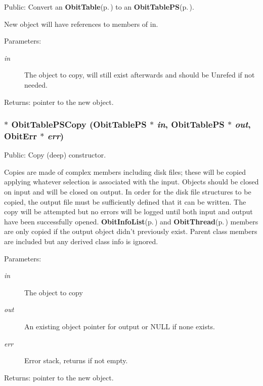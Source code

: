 Public: Convert an {\bf Obit\-Table}{\rm (p.\,\pageref{structObitTable})} to an {\bf Obit\-Table\-PS}{\rm (p.\,\pageref{structObitTablePS})}. 

New object will have references to members of in. \begin{Desc}
\item[Parameters:]
\begin{description}
\item[{\em in}]The object to copy, will still exist afterwards and should be Unrefed if not needed. \end{description}
\end{Desc}
\begin{Desc}
\item[Returns:]pointer to the new object. \end{Desc}
\subsubsection{$\ast$ Obit\-Table\-PSCopy ({\bf Obit\-Table\-PS} $\ast$ {\em in}, {\bf Obit\-Table\-PS} $\ast$ {\em out}, {\bf Obit\-Err} $\ast$ {\em err})}\label{ObitTablePS_8h_a14}


Public: Copy (deep) constructor. 

Copies are made of complex members including disk files; these will be copied applying whatever selection is associated with the input. Objects should be closed on input and will be closed on output. In order for the disk file structures to be copied, the output file must be sufficiently defined that it can be written. The copy will be attempted but no errors will be logged until both input and output have been successfully opened. {\bf Obit\-Info\-List}{\rm (p.\,\pageref{structObitInfoList})} and {\bf Obit\-Thread}{\rm (p.\,\pageref{structObitThread})} members are only copied if the output object didn't previously exist. Parent class members are included but any derived class info is ignored. \begin{Desc}
\item[Parameters:]
\begin{description}
\item[{\em in}]The object to copy \item[{\em out}]An existing object pointer for output or NULL if none exists. \item[{\em err}]Error stack, returns if not empty. \end{description}
\end{Desc}
\begin{Desc}
\item[Returns:]pointer to the new object. \end{Desc}

